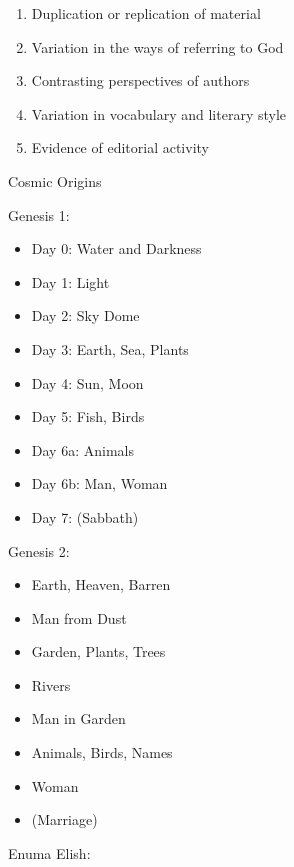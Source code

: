 \documentclass{article}
\begin{document}
    \begin{enumerate}
        \item Duplication or replication of material
        \item Variation in the ways of referring to God
        \item Contrasting perspectives of authors
        \item Variation in vocabulary and literary style
        \item Evidence of editorial activity
    \end{enumerate}

\centerline{Cosmic Origins}

    Genesis 1:

    \begin{itemize}
        \item Day 0: Water and Darkness
        \item Day 1: Light
        \item Day 2: Sky Dome
        \item Day 3: Earth, Sea, Plants
        \item Day 4: Sun, Moon
        \item Day 5: Fish, Birds
        \item Day 6a: Animals
        \item Day 6b: Man, Woman
        \item Day 7: (Sabbath)
    \end{itemize}

    Genesis 2:

    \begin{itemize}
        \item Earth, Heaven, Barren
        \item Man from Dust
        \item Garden, Plants, Trees
        \item Rivers
        \item Man in Garden
        \item Animals, Birds, Names
        \item Woman
        \item (Marriage)
    \end{itemize}

    Enuma Elish:
\end{document}
